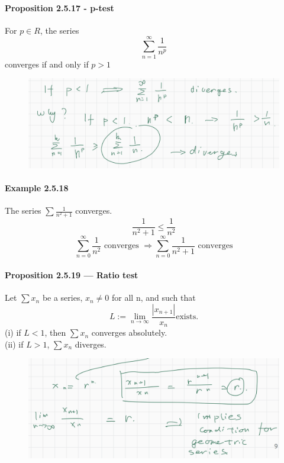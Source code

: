 \documentclass{article}
\begin{document}
\paragraph{Proposition 2.5.17 - p-test}
For $p\in R$, the series $$\sum_{n=1}^{\infty}\frac{1}{n^p}$$ converges if and only if $p>1$
\begin{figure}[H]
    \centering
    \includegraphics{0145}
\end{figure}
\paragraph{Example 2.5.18}
The series $\sum\frac{1}{n^2+1}$ converges.
$$\frac{1}{n^2+1}\leq \frac{1}{n^2}$$
$$\sum_{n=0}^{\infty}\frac{1}{n^2} \text{ converges }\Longrightarrow \sum_{n=0}^{\infty}\frac{1}{n^2+1} \text{ converges}$$
\paragraph{Proposition 2.5.19 — Ratio test}
Let $\sum x_n$ be a series, $x_n\neq 0$ for all n, and such that $$L:=\lim_{n\to \infty}\frac{|x_{n+1}|}{x_n} \text{exists.}$$ 
(i) if $L<1$, then $\sum x_n$ converges absolutely.\\
(ii) if $L>1$, $\sum x_n$ diverges.\\
\begin{figure}
    \centering
    \includegraphics{0146}
\end{figure}
\end{document}
